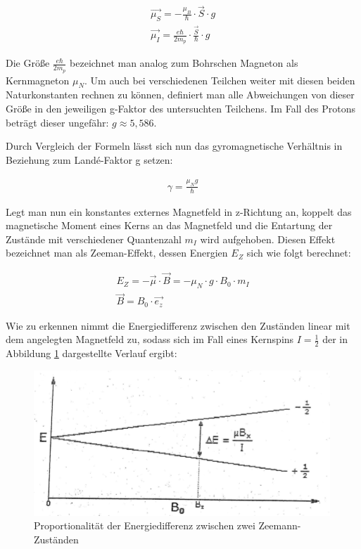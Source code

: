 \begin{align}
\overrightarrow{\mu_S}=-\frac{\mu_B}{\hbar}\cdot \overrightarrow{S}\cdot g \\
\overrightarrow{\mu_I}=\frac{e\hbar}{2m_p}\cdot \frac{\overrightarrow{S}}{\hbar}\cdot g 
\end{align}

Die Größe $\frac{e\hbar}{2m_p}$ bezeichnet man analog zum Bohrschen Magneton als Kernmagneton $\mu_N$. Um auch bei verschiedenen Teilchen weiter mit diesen beiden Naturkonstanten rechnen zu können, definiert man alle Abweichungen von dieser Größe in den jeweiligen g-Faktor des untersuchten Teilchens. Im Fall des Protons beträgt dieser ungefähr: $g \approx 5,586$.

Durch Vergleich der Formeln lässt sich nun das gyromagnetische Verhältnis in Beziehung zum Landé-Faktor g setzen:

\begin{align}
\gamma = \frac{\mu_N g}{\hbar}
\end{align}

Legt man nun ein konstantes externes Magnetfeld in z-Richtung an, koppelt das magnetische Moment eines Kerns an das Magnetfeld und die Entartung der Zustände mit verschiedener Quantenzahl $m_I$ wird aufgehoben. Diesen Effekt bezeichnet man als Zeeman-Effekt, dessen Energien $E_Z$ sich wie folgt berechnet:

\begin{align}
E_Z = -\overrightarrow{\mu}\cdot\overrightarrow{B}=-\mu_N \cdot g \cdot B_0 \cdot m_I \\
\overrightarrow{B}=B_0\cdot \overrightarrow{e_z}
\end{align}

Wie zu erkennen nimmt die Energiedifferenz zwischen den Zuständen linear mit dem angelegten Magnetfeld zu, sodass sich im Fall eines Kernspins $I=\frac{1}{2}$ der in Abbildung \ref{prop} dargestellte Verlauf ergibt:

\begin{figure}[htbp] 
     \includegraphics{Aufspaltung.png}
  \caption{Proportionalität der Energiedifferenz zwischen zwei Zeemann-Zuständen \cite{anleitung}}
  \label{prop}
\end{figure}

